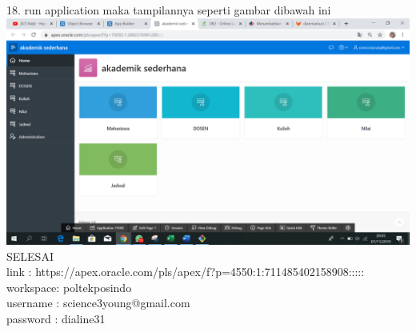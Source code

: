 \documentclass{article}
\begin{document}
\item 18. run application maka tampilannya seperti gambar dibawah ini\\
\includegraphics[width=15cm\textwidth]{figure/run.png}\\

SELESAI \\









link : https://apex.oracle.com/pls/apex/f?p=4550:1:711485402158908:::::\\
workspace: poltekposindo\\
username : science3young@gmail.com\\
password : dialine31\\
\end{document}
